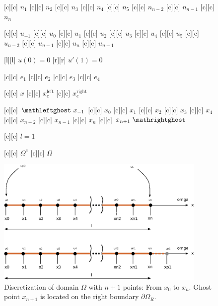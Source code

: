 \begin{figure}[ht]
	\centering
	\footnotesize

	[c] {$n_1$}
	[c] {$n_2$}
	[c] {$n_3$}
	[c] {$n_4$}
	[c] {$n_5$}
	[c] {$n_{n-2}$}
	[c] {$n_{n-1}$}
	[c] {$n_{n}$}

	[c] {$u_{-1}$}
	[c] {$u_0$}
	[c] {$u_1$}
	[c] {$u_2$}
	[c] {$u_3$}
	[c] {$u_4$}
	[c] {$u_5$}
	[c] {$u_{n-2}$}
	[c] {$u_{n-1}$}
	[c] {$u_{n}$}
	[c] {$u_{n+1}$}

	[l] {$u(0)=0$}
	[r] {$u'(1)=0$}

	[c] {$e_1$}
	[c] {$e_2$}
	[c] {$e_3$}
	[c] {$e_4$}

	[c] {$x$}
	[c] {$x_{e}^{\text{left}}$}
	[c] {$x_{e}^{\text{right}}$}

	[c] {$\mathleftghost \ x_{-1}$}
	[c] {$x_0$}
	[c] {$x_1$}
	[c] {$x_2$}
	[c] {$x_3$}
	[c] {$x_4$}
	[c] {$x_{n-2}$}
	[c] {$x_{n-1}$}
	[c] {$x_{n}$}
	[c] {$x_{n+1} \ \mathrightghost$}

	[c] {$l=1$}

	[c] {$\Omega^{e}$}
	[c] {$\Omega$}

	\includegraphics[width=0.9\textwidth]{discretizeGhostRight.eps}

	\caption{Discretization of domain $\Omega$ with $n+1$ points: From $x_{0}$ to $x_{n}$.
		Ghost point $x_{n+1}$ is located on the right boundary $\partial\Omega_{R}$.}
	\label{\LABEL}
\end{figure}